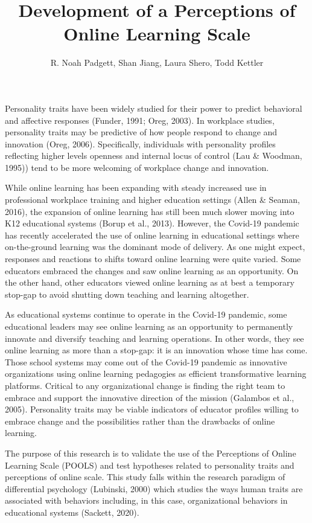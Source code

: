 \documentclass[man, noextraspace, floatsintext, 12pt]{apa7}
\title{Development of a Perceptions of Online Learning Scale}
\author{R. Noah Padgett, Shan Jiang, Laura Shero, Todd Kettler}
\begin{document}
\maketitle

Personality traits have been widely studied for their power to predict behavioral and affective responses (Funder, 1991; Oreg, 2003). In workplace studies, personality traits may be predictive of how people respond to change and innovation (Oreg, 2006). Specifically, individuals with personality profiles reflecting higher levels openness and internal locus of control (Lau & Woodman, 1995)) tend to be more welcoming of workplace change and innovation. 

While online learning has been expanding with steady increased use in professional workplace training and higher education settings (Allen & Seaman, 2016), the expansion of online learning has still been much slower moving into K12 educational systems (Borup et al., 2013). However, the Covid-19 pandemic has recently accelerated the use of online learning in educational settings where on-the-ground learning was the dominant mode of delivery. As one might expect, responses and reactions to shifts toward online learning were quite varied. Some educators embraced the changes and saw online learning as an opportunity. On the other hand, other educators viewed online learning as at best a temporary stop-gap to avoid shutting down teaching and learning altogether. 

As educational systems continue to operate in the Covid-19 pandemic, some educational leaders may see online learning as an opportunity to permanently innovate and diversify teaching and learning operations. In other words, they see online learning as more than a stop-gap: it is an innovation whose time has come. Those school systems may come out of the Covid-19 pandemic as innovative organizations using online learning pedagogies as efficient transformative learning platforms. Critical to any organizational change is finding the right team to embrace and support the innovative direction of the mission (Galambos et al., 2005). Personality traits may be viable indicators of educator profiles willing to embrace change and the possibilities rather than the drawbacks of online learning. 

The purpose of this research is to validate the use of the Perceptions of Online Learning Scale (POOLS) and test hypotheses related to personality traits and perceptions of online scale. This study falls within the research paradigm of differential psychology (Lubinski, 2000) which studies the ways human traits are associated with behaviors including, in this case, organizational behaviors in educational systems (Sackett, 2020). 
\end{document}
